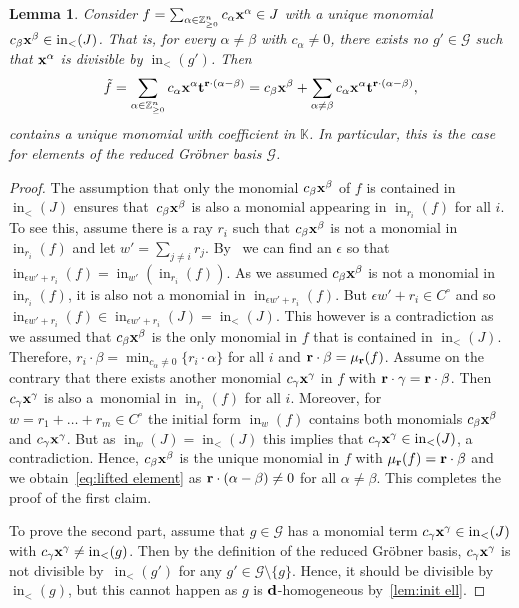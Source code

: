 \documentclass[10pt,a4paper]{amsart}
\newcommand{\thlabel}[1]{\label{#1}}
\newcommand{\thref}[1]{\ref{#1}}
\newtheorem{Lemma}[Theorem]{Lemma}
\numberwithin{equation}{section}
\DeclareMathOperator{\init}{in}
\begin{document}
\begin{Lemma}\thlabel{lem:lifts}
Consider $f=\sum_{\alpha \in \mathbb Z^n_{\ge 0}} c_\alpha{\bf x}^\alpha\in J$ with a unique monomial $c_\beta{\bf x}^\beta\in \init_<(J)$. That is, for every $\alpha\neq\beta$ with $c_\alpha\neq 0$, there exists no $g'\in\mathcal G$ such that ${\bf x}^\alpha$ is divisible by $\init_<(g')$.
Then
\begin{equation}\label{eq:lifted element}
\tilde f = \sum_{\alpha \in \mathbb Z^n_{\ge 0}} c_\alpha {\bf x}^{\alpha} {\bf t}^{{\bf r}\cdot(\alpha -\beta)} = c_\beta {\bf x}^{\beta} + \sum_{\alpha\not=\beta} c_\alpha{\bf x}^{\alpha}{\bf t}^{{\bf r}\cdot (\alpha-\beta)},
\end{equation}
contains a unique monomial with coefficient in $\mathbb K$.
In particular, this is the case for elements of the reduced Gr\"obner basis $\mathcal G$.
\end{Lemma}
\begin{proof}
The assumption that only the monomial $c_\beta{\bf x}^\beta$ of $f$ is contained in $\init_<(J)$ ensures that~$c_\beta{\bf x}^\beta$ is also a monomial appearing in $\init_{r_i}(f)$ for all $i$. To see this, assume there is a ray $r_i$ such that $c_\beta{\bf x}^\beta$ is not a monomial in $\init_{r_i}(f)$ and let $w'=\sum_{j\not=i} r_j$. By~\cite[Lemma~2.4.5]{M-S} we can find an $\epsilon$ so that $\init_{\epsilon w'+r_i}(f)=\init_{w'}(\init_{r_i}(f))$. As we assumed $c_\beta{\bf x}^\beta$ is not a monomial in $\init_{r_i}(f)$, it is also not a monomial in $\init_{\epsilon w'+r_i}(f)$. But $\epsilon w'+r_i\in C^\circ$ and so $\init_{\epsilon w'+r_i}(f)\in \init_{\epsilon w'+r_i}(J)=\init_<(J)$. This however is a contradiction as we assumed that $c_\beta{\bf x}^\beta$ is the only monomial in $f$ that is contained in $\init_<(J)$.
Therefore, $r_i\cdot\beta=\min_{c_\alpha\not =0}\{r_i\cdot \alpha\}$ for all $i$ and ${\bf r}\cdot \beta=\mu_{\bf r}(f)$.
Assume on the contrary that there exists another monomial $c_\gamma{\bf x}^\gamma$ in $f$ with ${\bf r}\cdot\gamma={\bf r}\cdot\beta$.
Then $c_\gamma{\bf x}^\gamma$ is also a~monomial in $\init_{r_i}(f)$ for all $i$.
Moreover, for $w=r_1+\dots+r_m\in C^\circ$ the initial form $\init_w(f)$ contains both monomials $c_\beta{\bf x}^\beta$ and $c_\gamma{\bf x}^\gamma$.
But as $\init_w(J)=\init_<(J)$ this implies that $c_\gamma{\bf x}^\gamma\in \init_<(J)$, a contradiction.
Hence, $c_\beta{\bf x}^\beta$ is the unique monomial in $f$ with $\mu_{\bf r}(f)={\bf r}\cdot \beta$ and we obtain~\eqref{eq:lifted element} as ${\bf r}\cdot(\alpha-\beta)\not=0$ for all $\alpha\not=\beta$. This completes the proof of the first claim.

To prove the second part, assume that $g\in\mathcal{G}$ has a monomial term $c_\gamma{\bf x}^{\gamma}\in \init_<(J)$ with $c_\gamma{\bf x}^{\gamma}\neq \init_<(g)$.
Then by the definition of the reduced Gr\"obner basis, $c_\gamma{\bf x}^{\gamma}$ is not divisible by~$\init_<(g')$ for any $g'\in \mathcal G\setminus \{g\}$.
Hence, it should be divisible by~$\init_<(g)$, but this cannot happen as $g$ is ${\bf d}$-homogeneous by~\thref{lem:init ell}.
\end{proof}
\end{document}
